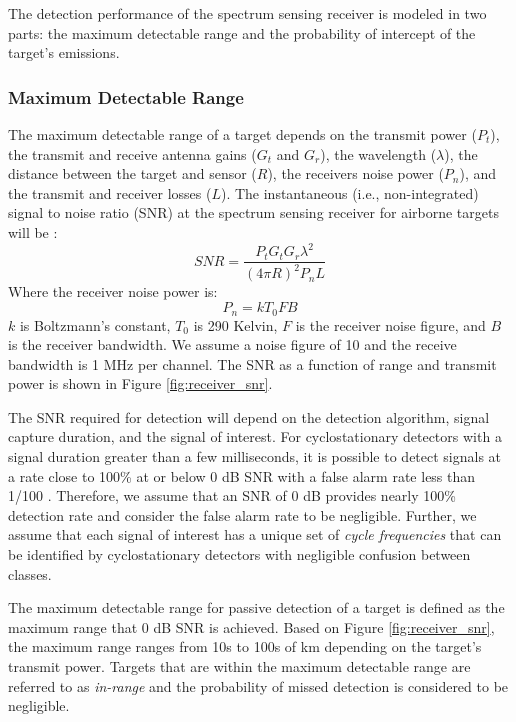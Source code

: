 \documentclass[journal,12pt,onecolumn,draftclsnofoot,]{IEEEtran}
\theoremstyle{definition}
\begin{document}
The detection performance of the spectrum sensing receiver is modeled in two parts: the maximum detectable range and the probability of intercept of the target's emissions. 
\subsubsection{Maximum Detectable Range}
The maximum detectable range of a target depends on the transmit power ($P_t$), the transmit and receive antenna gains ($G_t$ and $G_r$), the wavelength ($\lambda$), the distance between the target and sensor ($R$), the receivers noise power ($P_n$), and the transmit and receiver losses ($L$). The instantaneous (i.e., non-integrated) signal to noise ratio (SNR) at the spectrum sensing receiver for airborne targets will be \cite[Chap. 2]{wiley2006}: 
\begin{equation}
	SNR = \frac{P_t G_t G_r \lambda^2}{(4 \pi R)^2 P_n L}
\end{equation}
Where the receiver noise power is:
\begin{equation}
	P_n = k T_0 F B
\end{equation}
$k$ is Boltzmann's constant, $T_0$ is 290 Kelvin, $F$ is the receiver noise figure, and $B$ is the receiver bandwidth. We assume a noise figure of 10 and the receive bandwidth is 1 MHz per channel. The SNR as a function of range and transmit power is shown in Figure \ref{fig:receiver_snr}. 

The SNR required for detection will depend on the detection algorithm, signal capture duration, and the signal of interest. For cyclostationary detectors with a signal duration greater than a few milliseconds, it is possible to detect signals at a rate close to 100\% at or below 0 dB SNR with a false alarm rate less than 1/100 \cite{cyclo_ofdm_detection, cyclo_lte_detection}. Therefore, we assume that an SNR of 0 dB provides nearly 100\% detection rate and consider the false alarm rate to be negligible. Further, we assume that each signal of interest has a unique set of \textit{cycle frequencies} that can be identified by cyclostationary detectors \cite{cyclo_ofdm_detection, cyclo_lte_detection} with negligible confusion between classes.

The maximum detectable range for passive detection of a target is defined as the maximum range that 0 dB SNR is achieved. Based on Figure \ref{fig:receiver_snr}, the maximum range ranges from 10s to 100s of km depending on the target's transmit power. Targets that are within the maximum detectable range are referred to as \textit{in-range} and the probability of missed detection is considered to be negligible.
\end{document}
